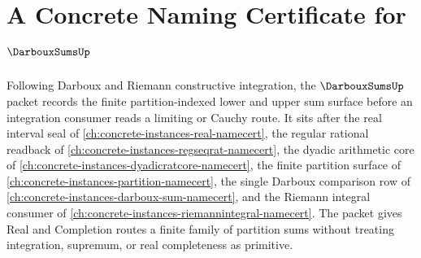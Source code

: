 \chapter{A Concrete Naming Certificate for $\DarbouxSumsUp$}
\label{ch:concrete-instances-darboux-sums-namecert}

Following Darboux and Riemann constructive integration, the $\DarbouxSumsUp$ packet records the finite partition-indexed lower and upper sum surface before an integration consumer reads a limiting or Cauchy route. It sits after the real interval seal of \autoref{ch:concrete-instances-real-namecert}, the regular rational readback of \autoref{ch:concrete-instances-regseqrat-namecert}, the dyadic arithmetic core of \autoref{ch:concrete-instances-dyadicratcore-namecert}, the finite partition surface of \autoref{ch:concrete-instances-partition-namecert}, the single Darboux comparison row of \autoref{ch:concrete-instances-darboux-sum-namecert}, and the Riemann integral consumer of \autoref{ch:concrete-instances-riemannintegral-namecert}. The packet gives Real and Completion routes a finite family of partition sums without treating integration, supremum, or real completeness as primitive.

